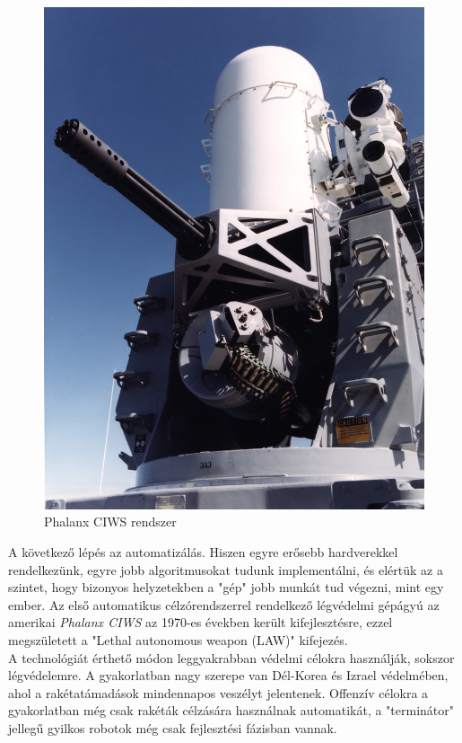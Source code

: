 \documentclass[11pt,a4paper]{article}
\begin{document}
\begin{figure}
	\centering
	\includegraphics[width=0.9\linewidth]{irod_phalanx} 
	\caption{Phalanx CIWS rendszer}
	\label{fig:irod_phalanx}
\end{figure}

A következő lépés az automatizálás. Hiszen egyre erősebb hardverekkel rendelkezünk, egyre jobb algoritmusokat tudunk implementálni, és elértük az a szintet, hogy bizonyos helyzetekben a "gép" jobb munkát tud végezni, mint egy ember. Az első automatikus célzórendszerrel rendelkező légvédelmi gépágyú az amerikai \textsl{Phalanx CIWS} az 1970-es években került kifejlesztésre, ezzel megszületett a "Lethal autonomous weapon (LAW)" kifejezés.\\

A technológiát érthető módon leggyakrabban védelmi célokra használják, sokszor légvédelemre. A gyakorlatban nagy szerepe van Dél-Korea és Izrael védelmében, ahol a rakétatámadások mindennapos veszélyt jelentenek. Offenzív célokra a gyakorlatban még csak rakéták célzására használnak automatikát, a "terminátor" jellegű gyilkos robotok még csak fejlesztési fázisban vannak.\\
\end{document}
